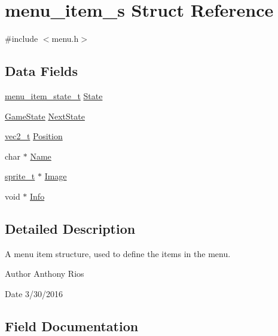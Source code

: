 \hypertarget{structmenu__item__s}{}\section{menu\+\_\+item\+\_\+s Struct Reference}
\label{structmenu__item__s}


{\ttfamily \#include $<$menu.\+h$>$}

\subsection*{Data Fields}
\begin{DoxyCompactItemize}
\item 
\hyperlink{globals_8h_a82d3a17b01eab2136e9f3ee50640b89f}{menu\+\_\+item\+\_\+state\+\_\+t} \hyperlink{structmenu__item__s_a549a5400c9f9b61bb66d0239bd21fe53}{State}
\item 
\hyperlink{globals_8h_a7899b65f1ea0f655e4bbf8d2a5714285}{Game\+State} \hyperlink{structmenu__item__s_ab0377c6660ff457af3498a0e121e42f0}{Next\+State}
\item 
\hyperlink{globals_8h_a773f2054819bb6014f1e50baa39cb5e3}{vec2\+\_\+t} \hyperlink{structmenu__item__s_ae69b5c22d5cd3911965dc992d40ba4fc}{Position}
\item 
char $\ast$ \hyperlink{structmenu__item__s_a5e6182c030324511dd82e9fa1a0ab071}{Name}
\item 
\hyperlink{graphics_8h_a5371414b10358aeda7c6bcec8196342f}{sprite\+\_\+t} $\ast$ \hyperlink{structmenu__item__s_a25fe573e4bbeefb06bccb0c0c9acf35f}{Image}
\item 
void $\ast$ \hyperlink{structmenu__item__s_a2459e5f05ca13ac8dff1f7b9abda4534}{Info}
\end{DoxyCompactItemize}


\subsection{Detailed Description}
A menu item structure, used to define the items in the menu.

\begin{DoxyAuthor}{Author}
Anthony Rios 
\end{DoxyAuthor}
\begin{DoxyDate}{Date}
3/30/2016 
\end{DoxyDate}


\subsection{Field Documentation}
